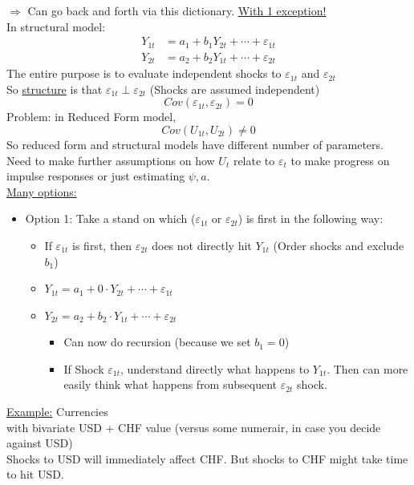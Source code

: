 $\Rightarrow$ Can go back and forth via this dictionary. \underline{With 1 exception!}\\


In structural model: 
\begin{align*}
    Y_{1t} &= a_1 + b_1 Y_{2t} + \cdots + \varepsilon_{1t} \\
    Y_{2t} &= a_2 + b_2 Y_{1t} + \cdots + \varepsilon_{2t}
\end{align*}
The entire purpose is to evaluate independent shocks to $\varepsilon_{1t}$ and $\varepsilon_{2t}$ \\
So \underline{structure} is that $\varepsilon_{1t} \perp \varepsilon_{2t}$ (Shocks are assumed independent) \[
Cov(\varepsilon_{1t}, \varepsilon_{2t}) = 0
\]
Problem: in Reduced Form model, \[
Cov(U_{1t}, U_{2t}) \neq 0
\]
So reduced form and structural models have different number of parameters. \\

Need to make further assumptions on how $U_t$ relate to $\varepsilon_t$ to make progress on impulse responses or just estimating $\psi,a$. \\

\noindent
\underline{Many options:}
\begin{itemize}
    \item Option 1: Take a stand on which ($\varepsilon_{1t}$ or $\varepsilon_{2t}$) is first in the following way:
    \begin{itemize}
        \item If $\varepsilon_{1t}$ is first, then $\varepsilon_{2t}$ does not directly hit $Y_{1t}$ (Order shocks and exclude $b_1$)
        \item[] $Y_{1t} = a_1 + 0\cdot Y_{2t} + \cdots + \varepsilon_{1t}$
        \item[] $Y_{2t} = a_2 + b_2 \cdot Y_{1t} + \cdots + \varepsilon_{2t}$
        \begin{itemize}
            \item Can now do recursion (because we set $b_1=0$)
            \item If Shock $\varepsilon_{1t}$, understand directly what happens to $Y_{1t}$. Then can more easily think what happens from subsequent $\varepsilon_{2t}$ shock.
        \end{itemize}
    \end{itemize}
\end{itemize}

\noindent
\underline{Example:} \quad Currencies \\
with bivariate USD + CHF value (versus some numerair, in case you decide against USD) \\
Shocks to USD will immediately affect CHF. But shocks to CHF might take time to hit USD. \\

